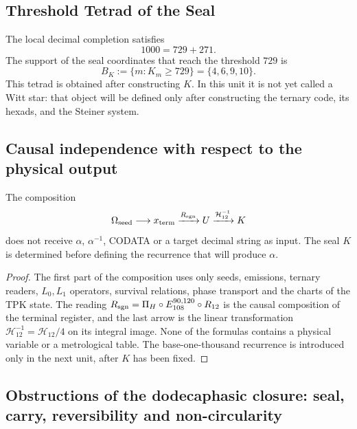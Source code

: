 \subsection{Threshold Tetrad of the Seal}

The local decimal completion satisfies
\[
 1000=729+271.
\]
The support of the seal coordinates that reach the threshold \(729\) is
\begin{equation}
 \boxed{
 B_K:=\{m:K_m\geq729\}=\{4,6,9,10\}.}
 \label{p3-83-c25-s4:eq:tetrada-umbral-k}
\end{equation}
This tetrad is obtained after constructing \(K\). In this unit it is not yet
called a Witt star: that object will be defined only after
constructing the ternary code, its hexads, and the Steiner system.

\subsection{Causal independence with respect to the physical output}

\begin{theorem}
\label{p3-83-c25-s4:thm:aislamiento-u-k-alpha-codata}
The composition
\begin{equation}
 \Omega_{\rm seed}\longrightarrow x_{\rm term}
 \xrightarrow{R_{\rm sgn}}U
 \xrightarrow{\mathcal H_{12}^{-1}}K
 \label{p3-83-c25-s4:eq:composicion-upstream-u-k}
\end{equation}
does not receive \(\alpha\), \(\alpha^{-1}\), CODATA or a target decimal
string as input. The seal \(K\) is determined before defining the
recurrence that will produce \(\alpha\).
\end{theorem}

\begin{proof}
The first part of the composition uses only seeds, emissions,
ternary readers, \(L_0,L_1\) operators, survival relations,
phase transport and the charts of the TPK state. The reading
\(R_{\rm sgn}=\Pi_H\circ E_{108}^{90,120}\circ R_{12}\) is the causal
composition of the terminal register, and the last arrow is the linear transformation
\(\mathcal H_{12}^{-1}=\mathcal H_{12}/4\)
on its integral image. None of the formulas contains a physical
variable or a metrological table. The base-one-thousand recurrence is introduced only
in the next unit, after \(K\) has been fixed.
\end{proof}

\subsection{Obstructions of the dodecaphasic closure: seal, carry, reversibility and non-circularity}

